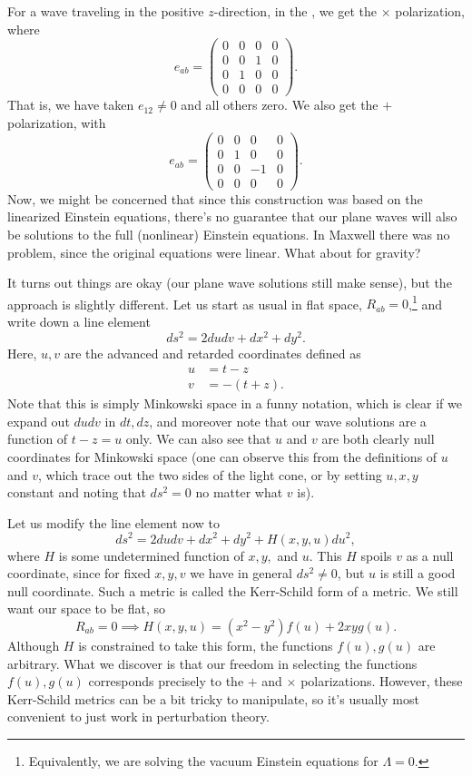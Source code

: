 For a wave traveling in the positive $z$-direction, in the , we get the $\times$ polarization, where
$$e_{ab}=\begin{pmatrix}
0&0&0&0\\
0&0&1&0\\
0&1&0&0\\
0&0&0&0
\end{pmatrix}.$$
That is, we have taken $e_{12}\neq 0$ and all others zero. We also get the $+$ polarization, with
$$e_{ab}=\begin{pmatrix}
0&0&0&0\\
0&1&0&0\\
0&0&-1&0\\
0&0&0&0
\end{pmatrix}.$$
Now, we might be concerned that since this construction was based on the linearized Einstein equations, there's no guarantee that our plane waves will also be solutions to the full (nonlinear) Einstein equations. In Maxwell there was no problem, since the original equations were linear. What about for gravity?

It turns out things are okay (our plane wave solutions still make sense), but the approach is slightly different. Let us start as usual in flat space, $R_{ab}=0$,\footnote{Equivalently, we are solving the vacuum Einstein equations for $\Lambda=0$.} and write down a line element
$$ds^2=2dudv + dx^2+dy^2.$$
Here, $u,v$ are the advanced and retarded coordinates defined as
\begin{align*}
    u&= t-z\\
    v&=-(t+z).
\end{align*}
Note that this is simply Minkowski space in a funny notation, which is clear if we expand out $dudv$ in $dt,dz$, and moreover note that our wave solutions are a function of $t-z=u$ only. We can also see that $u$ and $v$ are both clearly null coordinates for Minkowski space (one can observe this from the definitions of $u$ and $v$, which trace out the two sides of the light cone, or by setting $u,x,y$ constant and noting that $ds^2=0$ no matter what $v$ is). 

Let us modify the line element now to
$$ds^2=2dudv + dx^2+dy^2+H(x,y,u)du^2,$$
where $H$ is some undetermined function of $x,y,$ and $u$. This $H$ spoils $v$ as a null coordinate, since for fixed $x,y,v$ we have in general $ds^2\neq 0$, but $u$ is still a good null coordinate. Such a metric is called the Kerr-Schild form of a metric. We still want our space to be flat, so
$$R_{ab}=0 \implies H(x,y,u)=(x^2-y^2)f(u)+2xy g(u).$$
Although $H$ is constrained to take this form, the functions $f(u),g(u)$ are arbitrary. What we discover is that our freedom in selecting the functions $f(u),g(u)$ corresponds precisely to the $+$ and $\times$ polarizations. However, these Kerr-Schild metrics can be a bit tricky to manipulate, so it's usually most convenient to just work in perturbation theory.

